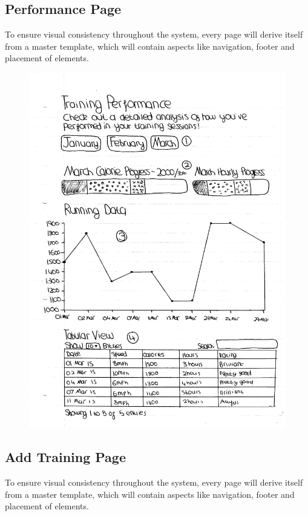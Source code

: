 \documentclass{article}[12pt,a4paper]
\begin{document}
\subsection{Performance Page}
To ensure visual consistency throughout the system, every page will derive itself from a master template, which will contain aspects like navigation, footer and placement of elements.

\begin{figure}[h!]
  \includegraphics[scale=0.55]{design_ui/user_performance}
\end{figure}
\clearpage

\subsection{Add Training Page}
To ensure visual consistency throughout the system, every page will derive itself from a master template, which will contain aspects like navigation, footer and placement of elements.
\end{document}
